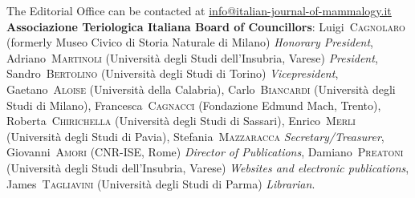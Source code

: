 {\begin{footnotesize}
  \noindent The Editorial Office can be contacted at \url{info@italian-journal-of-mammalogy.it}
  \vspace{\hysspacer}\\
  \noindent\textbf{Associazione Teriologica Italiana Board of Councillors}:
    Luigi~\textsc{Cagnolaro} (formerly Museo Civico di Storia Naturale di Milano) \textit{Honorary President}, Adriano~\textsc{Martinoli} (Università degli Studi dell'Insubria, Varese) \textit{President}, Sandro~\textsc{Bertolino} (Università degli Studi di Torino) \textit{Vicepresident}, Gaetano~\textsc{Aloise} (Università della Calabria), Carlo~\textsc{Biancardi} (Università degli Studi di Milano), Francesca~\textsc{Cagnacci} (Fondazione Edmund Mach, Trento),     Roberta~\textsc{Chirichella} (Università degli Studi di Sassari), Enrico~\textsc{Merli} (Università degli Studi di Pavia), Stefania~\textsc{Mazzaracca} \textit{Secretary/Treasurer}, Giovanni~\textsc{Amori} (CNR-ISE, Rome) \textit{Director of Publications}, Damiano~\textsc{Preatoni} (Università degli Studi dell'Insubria, Varese) \textit{Websites and electronic publications}, James~\textsc{Tagliavini} (Università degli Studi di Parma) \textit{Librarian}.\par
  \end{footnotesize}  
  \hysfooter%
  \endgroup}

